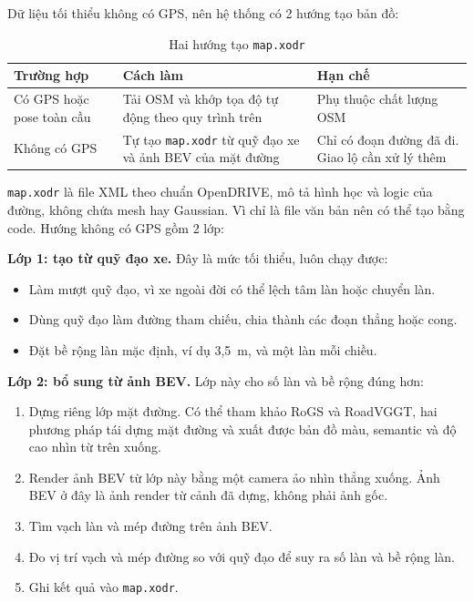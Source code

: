 Dữ liệu tối thiểu không có GPS, nên hệ thống có 2 hướng tạo bản đồ:

\begin{table}[H]
  \centering
  \small
  \caption{Hai hướng tạo \texttt{map.xodr}}
  \begin{tabularx}{\linewidth}{>{\raggedright\arraybackslash}p{2.9cm} >{\raggedright\arraybackslash}X >{\raggedright\arraybackslash}X}
    \toprule
    \textbf{Trường hợp} & \textbf{Cách làm} & \textbf{Hạn chế} \\
    \midrule
    Có GPS hoặc pose toàn cầu & Tải OSM và khớp tọa độ tự động theo quy trình trên & Phụ thuộc chất lượng OSM \\
    \addlinespace
    Không có GPS & Tự tạo \texttt{map.xodr} từ quỹ đạo xe và ảnh BEV của mặt đường & Chỉ có đoạn đường đã đi. Giao lộ cần xử lý thêm \\
    \bottomrule
  \end{tabularx}
\end{table}

\texttt{map.xodr} là file XML theo chuẩn OpenDRIVE, mô tả hình học và logic của đường, không chứa mesh hay Gaussian. Vì chỉ là file văn bản nên có thể tạo bằng code. Hướng không có GPS gồm 2 lớp:

\textbf{Lớp 1: tạo từ quỹ đạo xe.} Đây là mức tối thiểu, luôn chạy được:
\begin{itemize}
  \item Làm mượt quỹ đạo, vì xe ngoài đời có thể lệch tâm làn hoặc chuyển làn.
  \item Dùng quỹ đạo làm đường tham chiếu, chia thành các đoạn thẳng hoặc cong.
  \item Đặt bề rộng làn mặc định, ví dụ 3,5~m, và một làn mỗi chiều.
\end{itemize}

\textbf{Lớp 2: bổ sung từ ảnh BEV.} Lớp này cho số làn và bề rộng đúng hơn:
\begin{enumerate}
  \item Dựng riêng lớp mặt đường. Có thể tham khảo RoGS và RoadVGGT, hai phương pháp tái dựng mặt đường và xuất được bản đồ màu, semantic và độ cao nhìn từ trên xuống.
  \item Render ảnh BEV từ lớp này bằng một camera ảo nhìn thẳng xuống. Ảnh BEV ở đây là ảnh render từ cảnh đã dựng, không phải ảnh gốc.
  \item Tìm vạch làn và mép đường trên ảnh BEV.
  \item Đo vị trí vạch và mép đường so với quỹ đạo để suy ra số làn và bề rộng làn.
  \item Ghi kết quả vào \texttt{map.xodr}.
\end{enumerate}

